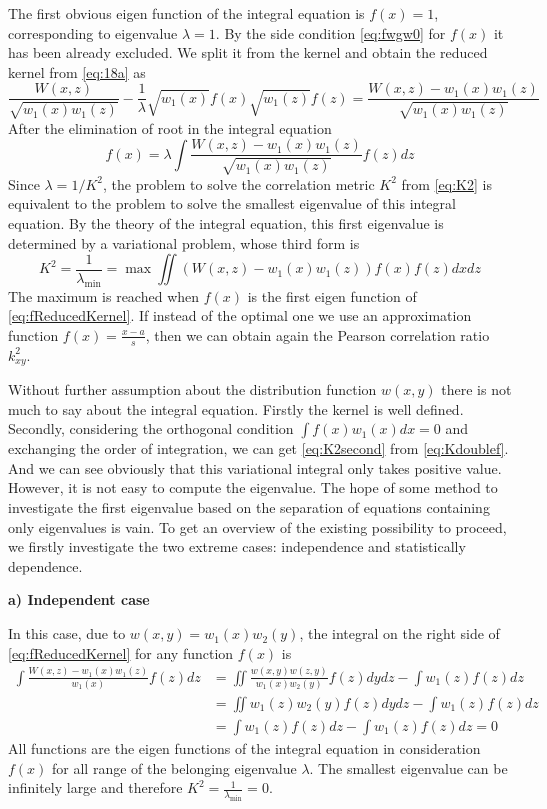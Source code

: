 \documentclass{article}
\begin{document}
The first obvious eigen function of the integral equation
is $f(x)=1$, corresponding to eigenvalue $\lambda=1$.
By the side condition \eqref{eq:fwgw0} for $f(x)$ it
has been already excluded.
We split it from the kernel and obtain the reduced kernel from \eqref{eq:18a} as
$$
\frac{W(x,z)}{\sqrt{w_1(x) w_1(z)}}
- \frac{1}{\lambda} \sqrt{w_1(x)} f(x) \sqrt{w_1(z)}f(z)
= \frac{W(x,z) - w_1(x) w_1(z)}{\sqrt{w_1(x) w_1(z)}}
$$
After the elimination of root in the integral equation
\begin{equation}\label{eq:fReducedKernel}
    f(x)=\lambda \int \frac{W(x,z) - w_1(x) w_1(z)}{\sqrt{w_1(x) w_1(z)}} f(z)dz
\end{equation}
Since $\lambda = 1/K^2$, the problem to solve the correlation metric $K^2$ from \eqref{eq:K2}
is equivalent to the problem to solve the smallest eigenvalue of this
integral equation. By the theory of the integral equation,
this first eigenvalue is determined by a variational problem, whose
third form is
\begin{equation}\label{eq:Kdoublef}
    K^2 = \frac{1}{\lambda_{\min}}
    = \max\iint(W(x,z) - w_1(x)w_1(z))f(x)f(z) dxdz
\end{equation}
The maximum is reached when $f(x)$ is the first eigen function
of \eqref{eq:fReducedKernel}.
If instead of the optimal one we use an approximation function
$f(x) = \frac{x-a}{s}$, then we can obtain again the Pearson
correlation ratio $k^2_{xy}$.

Without further assumption about the distribution function
$w(x,y)$ there is not much to say about the integral equation.
Firstly the kernel is well defined. Secondly, considering
the orthogonal condition $\int f(x)w_1(x)dx=0$
and exchanging the order of integration, we can get
\eqref{eq:K2second} from \eqref{eq:Kdoublef}. And we can see
obviously that this variational integral only takes positive
value. However, it is not easy to compute the eigenvalue.
The hope of some method to investigate the first eigenvalue
based on the separation of equations containing only eigenvalues is vain. To get an overview of the existing possibility to proceed,
we firstly investigate the two extreme cases: independence
and statistically dependence.

\textbf{a) Independent case}

In this case, due to $w(x,y) = w_1(x) w_2(y)$, the integral
on the right side of \eqref{eq:fReducedKernel} for any function
$f(x)$ is
\begin{align*}
    \int \frac{W(x,z) - w_1(x) w_1(z)}{w_1(x)}
    f(z) dz
    &= \iint \frac{w(x,y) w(z,y)}{w_1(x)w_2(y)} f(z) dy dz- \int w_1(z) f(z) dz \\
    &= \iint w_1(z) w_2(y) f(z) dydz
    - \int w_1(z) f(z) dz \\
    &= \int w_1(z) f(z) dz-\int w_1(z) f(z) dz=0
\end{align*}
All functions are the eigen functions of the integral equation in consideration $f(x)$ for all range of the belonging eigenvalue $\lambda$.
The smallest eigenvalue can be infinitely large and therefore
$K^2 = \frac{1}{\lambda_{\min}} = 0$.
\end{document}

